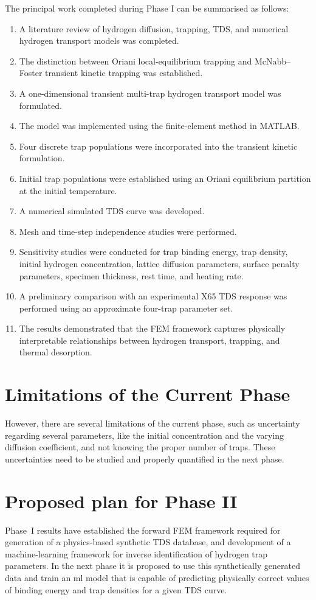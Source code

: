 \documentclass[a4paper,12pt,oneside]{report}
\begin{document}
The principal work completed during Phase I can be summarised as follows:
\begin{enumerate}
  \item A literature review of hydrogen diffusion, trapping, TDS, and numerical hydrogen transport models was completed.
  \item The distinction between Oriani local-equilibrium trapping and McNabb--Foster transient kinetic trapping was established.
  \item A one-dimensional transient multi-trap hydrogen transport model was formulated.
  \item The model was implemented using the finite-element method in MATLAB.
  \item Four discrete trap populations were incorporated into the transient kinetic formulation.
  \item Initial trap populations were established using an Oriani equilibrium partition at the initial temperature.
  \item A numerical simulated TDS curve was developed.
  \item Mesh and time-step independence studies were performed.
  \item Sensitivity studies were conducted for trap binding energy, trap density, initial hydrogen concentration, lattice diffusion parameters, surface penalty parameters, specimen thickness, rest time, and heating rate.
  \item A preliminary comparison with an experimental X65 TDS response was performed using an approximate four-trap parameter set.
  \item The results demonstrated that the FEM framework captures physically interpretable relationships between hydrogen transport, trapping, and thermal desorption.
\end{enumerate}

\section{Limitations of the Current Phase}
\label{sec:limitations}

However, there are several limitations of the current phase, such as uncertainty regarding several parameters, like the initial concentration and the varying diffusion coefficient, and not knowing the proper number of traps. These uncertainties need to be studied and properly quantified in the next phase.

\section{Proposed plan for Phase II}
\label{sec:futurework}
Phase~I results have established the forward FEM framework required for generation of a physics-based synthetic TDS database, and development of a machine-learning framework for inverse identification of hydrogen trap parameters. 
In the next phase it is proposed to use this synthetically generated data and train an ml model that is capable of predicting physically correct values of binding energy and trap densities for a given TDS curve.
\end{document}
